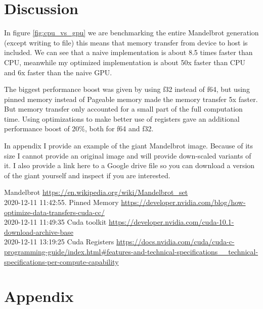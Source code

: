 \documentclass{article}
\begin{document}
\section{Discussion}%
\label{sec:discussion}

In figure \ref{fig:cpu_vs_gpu} we are benchmarking the entire Mandelbrot generation (except
writing to file) this means that memory transfer from device to host is included. We can see
that a naive implementation is about 8.5 times faster than CPU, meanwhile my optimized
implementation is about 50x faster than CPU and 6x faster than the naive GPU.

The biggest performance boost was given by using f32 instead of f64, but using pinned memory
instead of Pageable memory made the memory transfer 5x faster. But memory transfer only
accounted for a small part of the full computation time. Using optimizations to make better
use of registers gave an additional performance boost of 20\%, both for f64
and f32.

In appendix I provide an example of the giant Mandelbrot image. Because of its size I cannot
provide an original image and will provide down-scaled variants of it. I also provide a link
here \href{..}{} to a Google drive file so you can download a version of the giant yourself
and inspect if you are interested.




\begin{thebibliography}{1}

   Mandelbrot \url{https://en.wikipedia.org/wiki/Mandelbrot_set} \\2020-12-11 11:42:55.
   Pinned Memory
    \url{https://developer.nvidia.com/blog/how-optimize-data-transfers-cuda-cc/} \\2020-12-11 11:49:35
   Cuda toolkit
    \url{https://developer.nvidia.com/cuda-10.1-download-archive-base} \\2020-12-11 13:19:25
   Cuda Registers
    \url{https://docs.nvidia.com/cuda/cuda-c-programming-guide/index.html#features-and-technical-specifications__technical-specifications-per-compute-capability}

\end{thebibliography}

\section{Appendix}%
\label{sec:appendinx}
\end{document}
